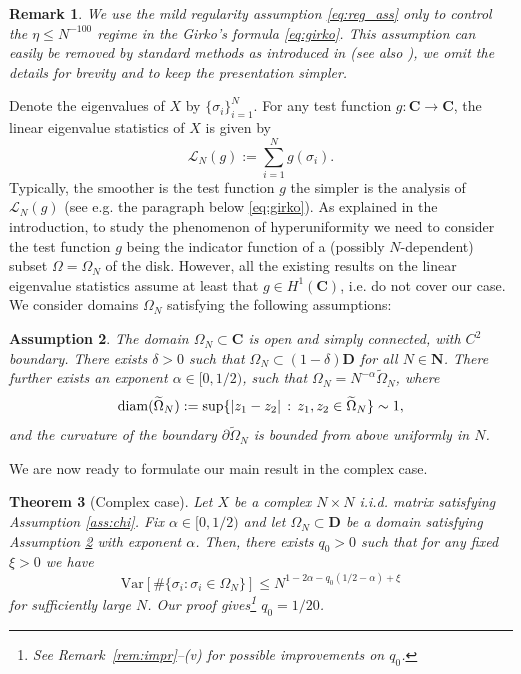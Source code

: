 \documentclass[10pt]{amsart}
\newtheorem{theorem}{Theorem}[section]
\newtheorem{remark}[theorem]{Remark}
\newtheorem{assumption}[theorem]{Assumption}
\numberwithin{equation}{section}
\newcommand{\C}{\mathbf{C}}
\newcommand{\N}{\mathbf{N}}
\newcommand{\Var}{\mathrm{Var}}
\begin{document}
\begin{remark} We use the mild regularity assumption \eqref{eq:reg_ass} only to control the $\eta\le N^{-100}$ regime in the Girko's formula \eqref{eq:girko}. This assumption can easily be removed by standard methods as introduced in \cite{TaoVu15} (see also \cite[Remark~2.2]{rightmost_ev}), we omit the details for brevity and to keep the presentation simpler. 
\end{remark}

Denote the eigenvalues of $X$ by $\{\sigma_i\}_{i=1}^N$. For any test function $g:\C\to\C$, the linear eigenvalue statistics of $X$ is given by
\begin{equation*}
\mathcal{L}_N(g):=\sum_{i=1}^N g(\sigma_i).
\end{equation*}
Typically, the smoother is the test function $g$ the simpler is the analysis of $\mathcal{L}_N(g)$ (see e.g. the paragraph below \eqref{eq:girko}). As explained in the introduction, to study the phenomenon of hyperuniformity we need to consider the test function $g$ being the indicator function of a  (possibly $N$-dependent) subset $\Omega=\Omega_N$ of the disk. However, all the existing results on the linear eigenvalue statistics assume at least that $g\in H^1(\C)$, i.e. do not cover our case. We consider domains $\Omega_N$ satisfying the following assumptions:

\begin{assumption}\label{ass:Omega} The domain $\Omega_N\subset\C$ is open and simply connected, with $C^2$ boundary. There exists $\delta>0$ such that $\Omega_N\subset (1-\delta)\mathbf{D}$ for all $N\in\N$. There further exists an exponent $\alpha\in [0,1/2)$, such that $\Omega_N=N^{-\alpha}\widetilde{\Omega}_N$, where 
\begin{equation}
{\rm{diam}}(\widetilde{\Omega}_N):=\sup \{|z_1-z_2|\,:\, z_1,z_2\in\widetilde{\Omega}_N\} \sim 1,
\label{eq:diam}
\end{equation}
and the curvature of the boundary $\partial\widetilde{\Omega}_N$ is bounded from above uniformly in $N$.
\end{assumption}

We are now ready to formulate our main result in the complex case.

\begin{theorem}[Complex case]
\label{theo:main1} Let $X$ be a complex $N\times N$ i.i.d. matrix satisfying Assumption \ref{ass:chi}. Fix $\alpha\in [0,1/2)$ and let $\Omega_N\subset\mathbf{D}$ be a domain satisfying Assumption \ref{ass:Omega} with exponent $\alpha$. Then, there exists $q_0>0$ such that for any fixed $\xi>0$ we have
\begin{equation}
\Var\left[ \#\{\sigma_i: \sigma_i\in \Omega_N\}\right] \le N^{1-2\alpha -q_0(1/2-\alpha)+\xi}
\label{eq:main1}
\end{equation}  
for sufficiently large $N$. Our proof gives\footnote{See Remark~\ref{rem:impr}--(v) for possible improvements on $q_0$.} $q_0=1/20$.
\end{theorem}
\end{document}
